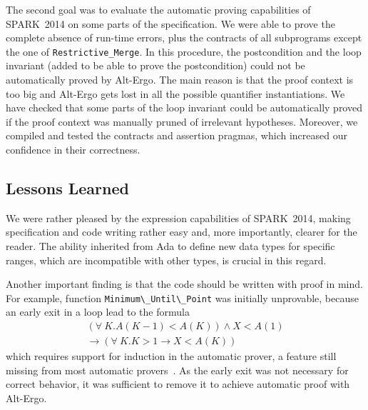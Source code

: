 \documentclass[10pt,a4paper,twocolumn]{article}
\newcommand{\newspark}{SPARK~2014\xspace}
\newcommand{\altergo}{Alt-Ergo\xspace}
\newcommand{\SPARK}[1]{\lstinline[language=Ada,basicstyle={\footnotesize
      \sffamily},framesep=0pt]$#1$}
\begin{document}
The second goal was to evaluate the automatic proving capabilities of \newspark
on some parts of the specification. We were able to prove the complete absence
of run-time errors, plus the contracts of all subprograms except the one of
\SPARK{Restrictive_Merge}. In this procedure, the postcondition and the loop
invariant (added to be able to prove the postcondition) could not be
automatically proved by \altergo. The main reason is that the proof context is
too big and \altergo gets lost in all the possible quantifier
instantiations. We have checked that some parts of the loop invariant could be
automatically proved if the proof context was manually pruned of irrelevant
hypotheses. Moreover, we compiled and tested the contracts and assertion
pragmas, which increased our confidence in their correctness.

\subsection{Lessons Learned}

We were rather pleased by the expression capabilities of \newspark, making
specification and code writing rather easy and, more importantly, clearer for the
reader. The ability inherited from Ada to define new data types for specific
ranges, which are incompatible with other types, is crucial in this regard.

Another important finding is that the code should be written with proof in
mind. For example, function \SPARK{Minimum\_Until\_Point} was initially
unprovable, because an early exit in a loop lead to the formula
\begin{multline*}
(\forall~K. A(K-1)<A(K)) \wedge X<A(1) \\
\rightarrow (\forall~K. K>1 \rightarrow X<A(K))
\end{multline*}
which requires support for induction in the automatic prover, a feature still
missing from most automatic provers~\cite{leino:2012:vmcai}. As the early exit
was not necessary for correct behavior, it was sufficient to remove it to
achieve automatic proof with \altergo.
\end{document}
